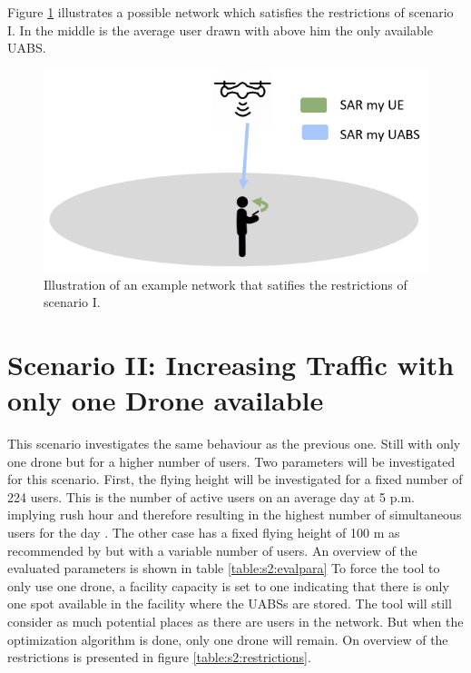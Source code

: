 Figure \ref{fig:IllustrationS1} illustrates a possible network which satisfies the restrictions of scenario I. In the middle is the average user drawn with above him the only available \gls{UABS}.
\begin{figure}[H]
\centering
  \includegraphics[width=\textwidth/3*2]{../images/IllustrationS1.png}
  \caption{Illustration of an example network that satifies the restrictions of scenario I.}
  \label{fig:IllustrationS1}
\end{figure}



\FloatBarrier
\section{Scenario II: Increasing Traffic with only one Drone available}

This scenario investigates the same behaviour as the previous one. Still with only one drone but for a higher number of users. 
Two parameters will be investigated for this scenario. First, the
flying height will be investigated for a fixed number of 224 users. 
This is the number of active users on an average day at 5 p.m. implying rush hour and therefore 
resulting in the highest number of simultaneous users for the day \cite{J2}. The other 
case has a fixed flying height of 100 m as recommended by \cite{J2} but with a variable number of users.
An overview of the evaluated parameters is shown in table \ref{table:s2:evalpara}
 To force the tool to only use one drone, a facility capacity is set to one 
indicating that there is only one spot available in the facility where the \gls{UABS}s are stored. The tool will still consider as much potential places 
as there are users in the network. But when the optimization algorithm is done, only one drone will remain.
On overview of the restrictions is presented in figure \ref{table:s2:restrictions}.

